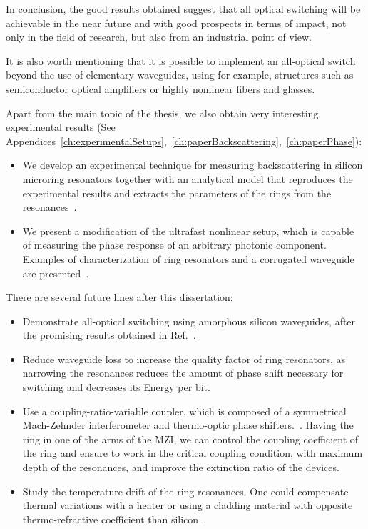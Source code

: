 In conclusion, the good results obtained suggest that all optical switching will be achievable in the near future and with good prospects in terms of impact, not only in the field of research, but also from an industrial point of view.

It is also worth mentioning that it is possible to implement an all-optical switch beyond the use of elementary waveguides, using for example, structures such as semiconductor optical amplifiers or highly nonlinear fibers and glasses.

Apart from the main topic of the thesis, we also obtain very interesting experimental results (See Appendices~\ref{ch:experimentalSetups},~\ref{ch:paperBackscattering},~\ref{ch:paperPhase}):

\begin{itemize}

\item We develop an experimental technique for measuring backscattering in silicon microring resonators together with an analytical model that reproduces the experimental results and extracts the parameters of the rings from the resonances~\cite{Ballesteros2011}.
 
\item We present a modification of the ultrafast nonlinear setup, which is capable of measuring the phase response of an arbitrary photonic component. Examples of characterization of ring resonators and a corrugated waveguide are presented~\cite{Matres2013b}.
 
\end{itemize}


There are several future lines after this dissertation:

\begin{itemize}
 \item Demonstrate all-optical switching using amorphous silicon waveguides, after the promising results obtained in Ref.~\cite{Matres2013}.
 
 \item Reduce waveguide loss to increase the quality factor of ring resonators, as narrowing the resonances reduces the amount of phase shift necessary for switching and decreases its Energy per bit.
 
 \item Use a coupling-ratio-variable coupler, which is composed of a symmetrical Mach-Zehnder interferometer and thermo-optic phase shifters.~\cite{Kominato1993}.
 Having the ring in one of the arms of the MZI, we can control the coupling coefficient of the ring and ensure to work in the critical coupling condition, with maximum depth of the resonances, and improve the extinction ratio of the devices.
 
 \item Study the temperature drift of the ring resonances. One could compensate thermal variations with a heater or using a cladding material with opposite thermo-refractive coefficient than silicon~\cite{Teng2009,Zhou2009a,Han2007}.

\end{itemize}



